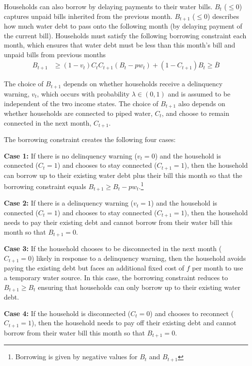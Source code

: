 \documentclass[12pt,table]{article}
\begin{document}
Households can also borrow by delaying payments to their water bills.  $B_t$ ($\leq0$) captures unpaid bills inherited from the previous month.  $B_{t+1}$ ($\leq0$) describes how much water debt to pass onto the following month (by delaying payment of the current bill).  Households must satisfy the following borrowing constraint each month, which ensures that water debt must be less than this month's bill and unpaid bills from previous months
\begin{align}\label{eq:borrowingconstraint}
B_{t+1} &\geq (1-v_t)  C_{t} C_{t+1} (B_t -pw_t) + (1-C_{t+1})B_t  \geq \overline{B}
\end{align}


The choice of $B_{t+1}$ depends on whether households receive a delinquency warning, $v_t$, which occurs with probability $\lambda \in (0,1)$ and is assumed to be independent of the two income states.  The choice of $B_{t+1}$ also depends on whether households are connected to piped water, $C_t$, and choose to remain connected in the next month, $C_{t+1}$.  


The borrowing constraint creates the following four cases:

\textbf{Case 1:} If there is no delinquency warning ($v_t=0$) and the household is connected ($C_{t}=1$) and chooses to stay connected ($C_{t+1}=1$), then the household can borrow up to their existing water debt plus their bill this month so that the borrowing constraint equals $B_{t+1}\geq B_t -  p w_t $.\footnote{Borrowing is given by negative values for $B_t$ and $B_{t+1}$}

\textbf{Case 2:} If there is a delinquency warning ($v_t=1$) and the household is connected ($C_t=1$) and chooses to stay connected ($C_{t+1}=1$), then the household needs to pay their existing debt and cannot borrow from their water bill this month so that $B_{t+1} = 0$.

\textbf{Case 3:} If the household chooses to be disconnected in the next month ($C_{t+1}=0$) likely in response to a delinquency warning, then the household avoids paying the existing debt but faces an additional fixed cost of $f$ per month to use a temporary water source.  In this case, the borrowing constraint reduces to $ B_{t+1} \geq B_t$ ensuring that households can only borrow up to their existing water debt.  

\textbf{Case 4:} If the household is disconnected ($C_t=0$) and chooses to reconnect ($C_{t+1}=1$), then the household needs to pay off their existing debt and cannot borrow from their water bill this month so that $B_{t+1} = 0$.  
\end{document}
